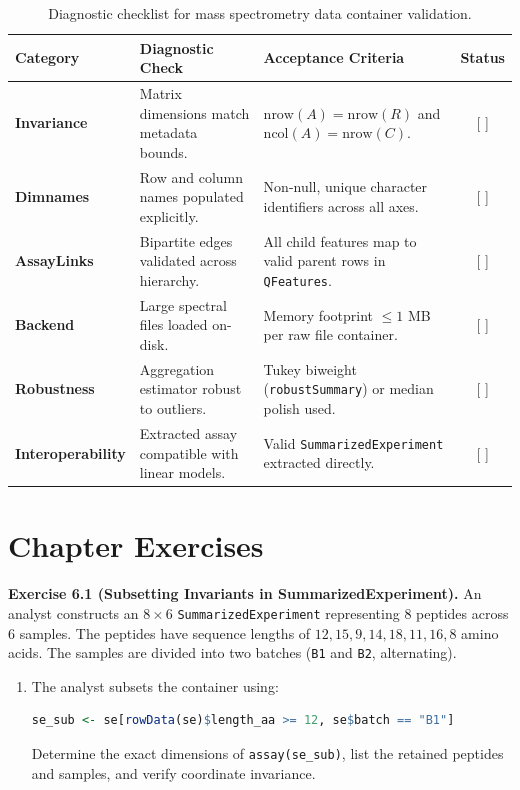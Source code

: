 \documentclass[11pt,twoside,openright]{book}
\begin{document}
\begin{table}[htbp]
\centering
\caption{Diagnostic checklist for mass spectrometry data container validation.}
\label{tab:containers_checklist}
\small
\begin{tabularx}{\textwidth}{>{\raggedright\arraybackslash}l >{\raggedright\arraybackslash}p{5.2cm} >{\raggedright\arraybackslash}X c}
\toprule
\textbf{Category} & \textbf{Diagnostic Check} & \textbf{Acceptance Criteria} & \textbf{Status} \\
\midrule
\textbf{Invariance} & Matrix dimensions match metadata bounds. & $\text{nrow}(A) = \text{nrow}(R)$ and $\text{ncol}(A) = \text{nrow}(C)$. & [ ] \\
\addlinespace
\textbf{Dimnames} & Row and column names populated explicitly. & Non-null, unique character identifiers across all axes. & [ ] \\
\addlinespace
\textbf{AssayLinks} & Bipartite edges validated across hierarchy. & All child features map to valid parent rows in \texttt{QFeatures}. & [ ] \\
\addlinespace
\textbf{Backend} & Large spectral files loaded on-disk. & Memory footprint $\le 1$ MB per raw file container. & [ ] \\
\addlinespace
\textbf{Robustness} & Aggregation estimator robust to outliers. & Tukey biweight (\texttt{robustSummary}) or median polish used. & [ ] \\
\addlinespace
\textbf{Interoperability} & Extracted assay compatible with linear models. & Valid \texttt{SummarizedExperiment} extracted directly. & [ ] \\
\bottomrule
\end{tabularx}
\end{table}

\FloatBarrier

\section{Chapter Exercises}
\label{sec:chapter_exercises}

\noindent\textbf{Exercise 6.1 (Subsetting Invariants in SummarizedExperiment).}\enspace
\label{ex:se_subsetting_invariants}
An analyst constructs an $8 \times 6$ \texttt{SummarizedExperiment} representing 8 peptides across 6 samples. The peptides have sequence lengths of $12, 15, 9, 14, 18, 11, 16, 8$ amino acids. The samples are divided into two batches (\texttt{B1} and \texttt{B2}, alternating).
\begin{enumerate}
    \item The analyst subsets the container using:
    \begin{lstlisting}[language=R]
    se_sub <- se[rowData(se)$length_aa >= 12, se$batch == "B1"]
    \end{lstlisting}
    Determine the exact dimensions of \texttt{assay(se\_sub)}, list the retained peptides and samples, and verify coordinate invariance.
\end{enumerate}
\end{document}
